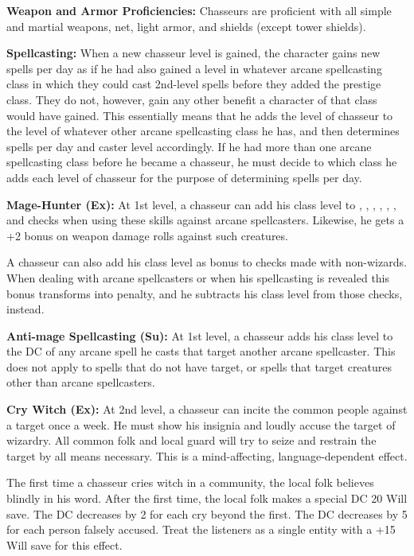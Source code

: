 {
\textbf{Weapon and Armor Proficiencies:} Chasseurs are proficient with all simple and martial weapons, net, light armor, and shields (except tower shields).

\textbf{Spellcasting:} When a new chasseur level is gained, the character gains new spells per day as if he had also gained a level in whatever arcane spellcasting class in which they could cast 2nd-level spells before they added the prestige class. They do not, however, gain any other benefit a character of that class would have gained. This essentially means that he adds the level of chasseur to the level of whatever other arcane spellcasting class he has, and then determines spells per day and caster level accordingly. If he had more than one arcane spellcasting class before he became a chasseur, he must decide to which class he adds each level of chasseur for the purpose of determining spells per day.

\textbf{Mage-Hunter (Ex):} At 1st level, a chasseur can add his class level to , , , , , , and  checks when using these skills against arcane spellcasters. Likewise, he gets a +2 bonus on weapon damage rolls against such creatures.

A chasseur can also add his class level as bonus to  checks made with non-wizards. When dealing with arcane spellcasters or when his spellcasting is revealed this bonus transforms into penalty, and he subtracts his class level from those checks, instead.

\textbf{Anti-mage Spellcasting (Su):} At 1st level, a chasseur adds his class level to the DC of any arcane spell he casts that target another arcane spellcaster. This does not apply to spells that do not have target, or spells that target creatures other than arcane spellcasters.

\textbf{Cry Witch (Ex):} At 2nd level, a chasseur can incite the common people against a target once a week. He must show his insignia and loudly accuse the target of wizardry. All common folk and local guard will try to seize and restrain the target by all means necessary. This is a mind-affecting, language-dependent effect.

The first time a chasseur cries witch in a community, the local folk believes blindly in his word. After the first time, the local folk makes a special DC 20 Will save. The DC decreases by 2 for each cry beyond the first. The DC decreases by 5 for each person falsely accused. Treat the listeners as a single entity with a +15 Will save for this effect.

}
